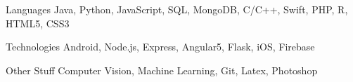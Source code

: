 

\begin{cvskills}

  \cvskill
    {Languages} %
    {Java, Python, JavaScript, SQL, MongoDB, C/C++, Swift, PHP, R, HTML5, CSS3} %

  \cvskill
    {Technologies} %
    {Android, Node.js, Express, Angular5, Flask, iOS, Firebase} %

  \cvskill
    {Other Stuff} %
    {Computer Vision, Machine Learning, Git, Latex, Photoshop} %

\end{cvskills}
